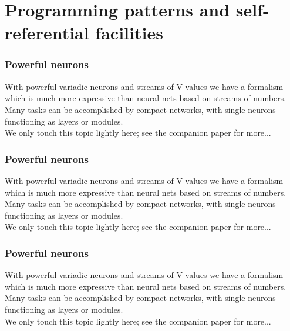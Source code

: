 \documentclass{beamer}
\newcommand{\msgray}[1]{{\color{mygray} #1}}
\begin{document}
\section{Programming patterns and self-referential facilities}



\begin{frame}

  \frametitle{Powerful neurons}

With powerful variadic neurons and streams of V-values we have a formalism which is much more
expressive than neural nets based on streams of numbers.\\[2ex]

\msgray{Many tasks can be accomplished by compact networks, with single neurons functioning as layers or modules.\\[2ex]

We only touch this topic lightly here; see the companion paper for more...}

\end{frame}

\begin{frame}

  \frametitle{Powerful neurons}

With powerful variadic neurons and streams of V-values we have a formalism which is much more
expressive than neural nets based on streams of numbers.\\[2ex]

Many tasks can be accomplished by compact networks, with single neurons functioning as layers or modules.\\[2ex]

\msgray{We only touch this topic lightly here; see the companion paper for more...}

\end{frame}

\begin{frame}

  \frametitle{Powerful neurons}

With powerful variadic neurons and streams of V-values we have a formalism which is much more
expressive than neural nets based on streams of numbers.\\[2ex]

Many tasks can be accomplished by compact networks, with single neurons functioning as layers or modules.\\[2ex]

We only touch this topic lightly here; see the companion paper for more...

\end{frame}
\end{document}
